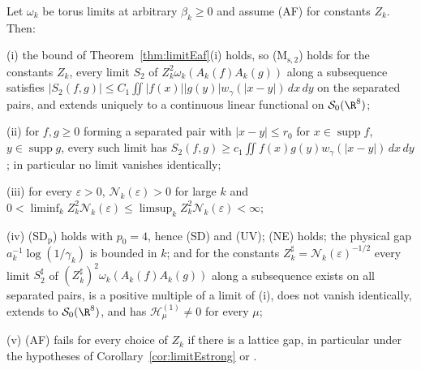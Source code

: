 \begin{theorem}\label{rE:af}
Let $\omega_k$ be torus limits at arbitrary $\beta_k\ge0$ and assume
\textup{(AF)} for constants $Z_k$. Then:

\textup{(i)} the bound of Theorem~\textup{\ref{thm:limitEaf}(i)} holds, so
\textup{(M$_{\mathrm s,2}$)} holds for the constants $Z_k$, every limit $S_2$
of $Z_k^2\omega_k(A_k(f)A_k(g))$ along a subsequence satisfies
$|S_2(f,g)|\le C_1\iint|f(x)||g(y)|w_\gamma(|x-y|)\,dx\,dy$ on the separated
pairs, and extends uniquely to a continuous linear functional on
$\mathcal S_0(\R^8)$;

\textup{(ii)} for $f,g\ge0$ forming a separated pair with $|x-y|\le r_0$ for
$x\in\operatorname{supp}f$, $y\in\operatorname{supp}g$, every such limit has
$S_2(f,g)\ge c_1\iint f(x)g(y)w_\gamma(|x-y|)\,dx\,dy$; in particular no
limit vanishes identically;

\textup{(iii)} for every $\varepsilon>0$, $\mathcal N_k(\varepsilon)>0$ for
large $k$ and $0<\liminf_kZ_k^2\mathcal N_k(\varepsilon)\le\limsup_kZ_k^2
\mathcal N_k(\varepsilon)<\infty$;

\textup{(iv)} \textup{(SD$_{\mathrm p}$)} holds with $p_0=4$, hence
\textup{(SD)} and \textup{(UV)}; \textup{(NE)} holds; the physical gap
$a_k^{-1}\log(1/\gamma_k)$ is bounded in $k$; and for the constants
$Z^\sharp_k=\mathcal N_k(\varepsilon)^{-1/2}$ every limit $S^\sharp_2$ of
$(Z^\sharp_k)^2\omega_k(A_k(f)A_k(g))$ along a subsequence exists on all
separated pairs, is a positive multiple of a limit of \textup{(i)}, does not
vanish identically, extends to $\mathcal S_0(\R^8)$, and has
$\mathcal H^{(1)}_\mu\ne0$ for every $\mu$;

\textup{(v)} \textup{(AF)} fails for every choice of $Z_k$ if there is a
lattice gap, in particular under the hypotheses of
Corollary~\textup{\ref{cor:limitEstrong}} or
\textup{\cite[Corollary~322]{BBLR26}}.
\end{theorem}

